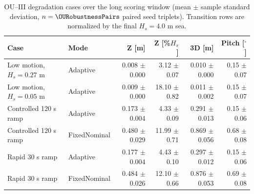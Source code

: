 \begin{table}[t]
  \centering
  \caption{OU--III degradation cases over the long scoring window (mean $\pm$ sample standard deviation, $n=\OURobustnessPairs$ paired seed triplets). Transition rows are normalized by the final $H_s=4.0$ m sea.}
  \label{tab:ou_robustness_stress}
  \footnotesize
  \setlength{\tabcolsep}{5pt}
  \begin{tabular}{@{}llrrrr@{}}
    \toprule
    Case & Mode & Z [m] & Z [\%$H_s$] & 3D [m] & Pitch [$^\circ$] \\
    \midrule
    Low motion, $H_s=0.27$ m & Adaptive & 0.008 $\pm$ 0.000 & 3.12 $\pm$ 0.07 & 0.010 $\pm$ 0.000 & 0.15 $\pm$ 0.07 \\
    Low motion, $H_s=0.05$ m & Adaptive & 0.009 $\pm$ 0.000 & 18.10 $\pm$ 0.82 & 0.011 $\pm$ 0.002 & 0.15 $\pm$ 0.07 \\
    Controlled 120 s ramp & Adaptive & 0.173 $\pm$ 0.004 & 4.33 $\pm$ 0.09 & 0.291 $\pm$ 0.013 & 0.15 $\pm$ 0.06 \\
    Controlled 120 s ramp & FixedNominal & 0.480 $\pm$ 0.029 & 11.99 $\pm$ 0.71 & 0.869 $\pm$ 0.056 & 0.68 $\pm$ 0.08 \\
    Rapid 30 s ramp & Adaptive & 0.177 $\pm$ 0.004 & 4.43 $\pm$ 0.10 & 0.297 $\pm$ 0.012 & 0.15 $\pm$ 0.06 \\
    Rapid 30 s ramp & FixedNominal & 0.484 $\pm$ 0.026 & 12.10 $\pm$ 0.66 & 0.876 $\pm$ 0.053 & 0.69 $\pm$ 0.08 \\
    \bottomrule
  \end{tabular}
\end{table}
